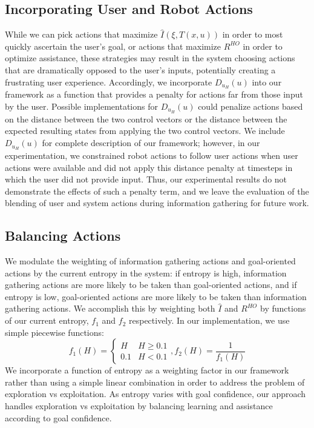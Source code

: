 \documentclass[conference]{IEEEtran}
\begin{document}
\subsection{Incorporating User and Robot Actions}
While we can pick actions that maximize $\hat{I}(\xi, T(x,u))$ in order to most quickly ascertain the user's goal, or actions that maximize $R^{HO}$ in order to optimize assistance, these strategies may result in the system choosing actions that are dramatically opposed to the user's inputs, potentially creating a frustrating user experience. Accordingly, we incorporate $D_{u_H}(u)$ into our framework as a function that provides a penalty for actions far from those input by the user. Possible implementations for $D_{u_H}(u)$ could penalize actions based on the distance between the two control vectors or the distance between the expected resulting states from applying the two control vectors. We include $D_{u_H}(u)$ for complete description of our framework; however, in our experimentation, we constrained robot actions to follow user actions when user actions were available and did not apply this distance penalty at timesteps in which the user did not provide input. Thus, our experimental results do not demonstrate the effects of such a penalty term, and we leave the evaluation of the blending of user and system actions during information gathering for future work.

\subsection{Balancing Actions}

We modulate the weighting of information gathering actions and goal-oriented actions by the current entropy in the system: if entropy is high, information gathering actions are more likely to be taken than goal-oriented actions, and if entropy is low, goal-oriented actions are more likely to be taken than information gathering actions. We accomplish this by weighting both $\hat{I}$ and $R^{HO}$ by functions of our current entropy, $f_1$ and $f_2$ respectively. In our implementation, we use simple piecewise functions:
\[
f_1(H) =
\begin{cases}
H & H\geq 0.1 \\
0.1 & H < 0.1
\end{cases}
,f_2(H) = \frac{1}{f_1(H)}
\]
We incorporate a function of entropy as a weighting factor in our framework rather than using a simple linear combination in order to address the problem of exploration vs exploitation. As entropy varies with goal confidence, our approach handles exploration vs exploitation by balancing learning and assistance according to goal confidence.
\end{document}
